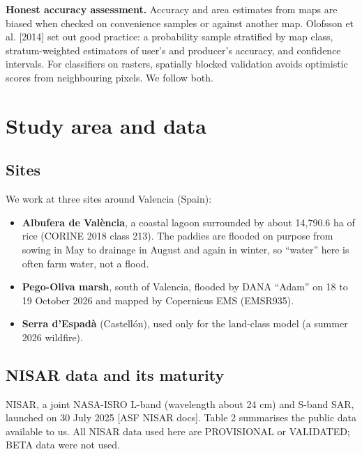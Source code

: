 \documentclass[10pt,twocolumn]{article}
\begin{document}
\textbf{Honest accuracy assessment.} Accuracy and area estimates from maps are biased when checked on convenience samples or against another map. Olofsson et al. [2014] set out good practice: a probability sample stratified by map class, stratum-weighted estimators of user's and producer's accuracy, and confidence intervals. For classifiers on rasters, spatially blocked validation avoids optimistic scores from neighbouring pixels. We follow both.

\section{Study area and data}
\subsection{Sites}
We work at three sites around Valencia (Spain):

\begin{itemize}
\item{} \textbf{Albufera de València}, a coastal lagoon surrounded by about 14,790.6 ha of rice (CORINE 2018 class 213). The paddies are flooded on purpose from sowing in May to drainage in August and again in winter, so ``water'' here is often farm water, not a flood.
\item{} \textbf{Pego-Oliva marsh}, south of Valencia, flooded by DANA ``Adam'' on 18 to 19 October 2026 and mapped by Copernicus EMS (EMSR935).
\item{} \textbf{Serra d'Espadà} (Castellón), used only for the land-class model (a summer 2026 wildfire).
\end{itemize}
\subsection{NISAR data and its maturity}
NISAR, a joint NASA-ISRO L-band (wavelength about 24 cm) and S-band SAR, launched on 30 July 2025 [ASF NISAR docs]. Table 2 summarises the public data available to us. All NISAR data used here are PROVISIONAL or VALIDATED; BETA data were not used.
\end{document}
